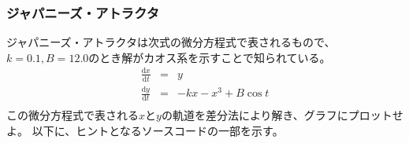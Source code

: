 \subsubsection{ジャパニーズ・アトラクタ}
ジャパニーズ・アトラクタは次式の微分方程式で表されるもので、
$k=0.1, B=12.0$のとき解がカオス系を示すことで知られている。
\begin{eqnarray}
  \frac{\mathrm{d}x}{\mathrm{d}t} &=& y\\
  \frac{\mathrm{d}y}{\mathrm{d}t} &=& -kx - x^3 + B \cos t\\
\end{eqnarray}
この微分方程式で表される$x$と$y$の軌道を差分法により解き、グラフにプロットせよ。
以下に、ヒントとなるソースコードの一部を示す。

